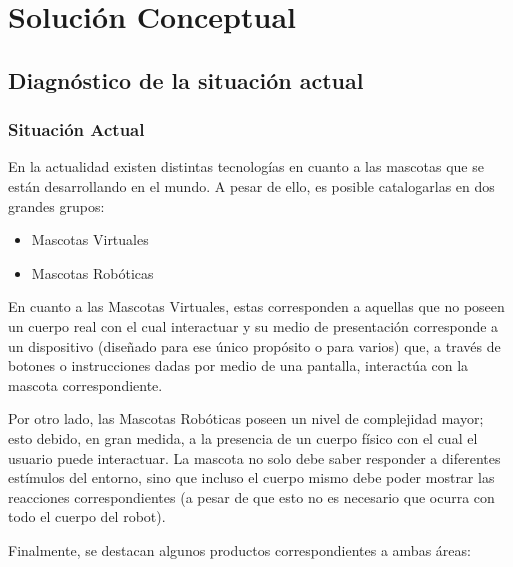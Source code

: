 \chapter{Soluci\'on Conceptual}
\newpage
\section{Diagn\'ostico de la situaci\'on actual}
\subsection{Situaci\'on Actual}

En la actualidad existen distintas tecnolog\'ias en cuanto a las mascotas que se est\'an de\-sa\-rro\-llan\-do en el mundo. A pesar de ello, es posible catalogarlas en dos grandes grupos:

\begin{itemize}
\item Mascotas Virtuales
\item Mascotas Rob\'oticas
\end{itemize}

En cuanto a las Mascotas Virtuales, estas corresponden a aquellas que no poseen un cuerpo real con el cual interactuar y su medio de presentaci\'on corresponde a un dispositivo (dise\~nado para ese \'unico prop\'osito o para varios) que, a trav\'es de botones o instrucciones dadas por medio de una pantalla, interact\'ua con la mascota correspondiente.

Por otro lado, las Mascotas Rob\'oticas poseen un nivel de complejidad mayor; esto debido, en gran medida, a la presencia de un cuerpo f\'isico con el cual el usuario puede interactuar. La mascota no solo debe saber responder a diferentes est\'imulos del entorno, sino que incluso el cuerpo mismo debe poder mostrar las reacciones correspondientes (a pesar de que esto no es necesario que ocurra con todo el cuerpo del robot).

Finalmente, se destacan algunos productos correspondientes a ambas \'areas:
